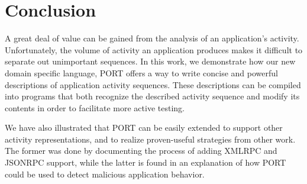 \section{Conclusion}
\label{sec:Conclusion}
%
%

A great deal of value can be gained from the analysis of an application's
activity.
Unfortunately,
the volume of activity
an application produces
makes it difficult
to separate out
unimportant sequences.
In this work,
we demonstrate how our new domain specific language,
PORT offers
a way to write concise and 
powerful
descriptions of
application activity sequences.
These descriptions
can be compiled
into programs that
both recognize the described activity
sequence
and modify its contents in order to
facilitate more active testing.

We have also
illustrated that PORT
can be
easily extended
to support other activity
representations, and to 
realize proven-useful
strategies from other work.
The former was done
by documenting the process
of adding XMLRPC and JSONRPC support,
while the latter is found in
 an explanation
of how PORT could be used to
detect malicious application behavior.



\clearpage
